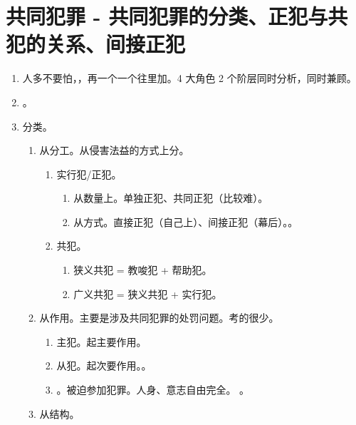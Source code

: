 \section{共同犯罪 - 共同犯罪的分类、正犯与共犯的关系、间接正犯}
\begin{enumerate}
  \item 人多不要怕，，再一个一个往里加。4 大角色 2 个阶层同时分析，同时兼顾。
  \item {}。
  \item 分类。
        \begin{enumerate}
          \item 从分工。从侵害法益的方式上分。
                \begin{enumerate}
                  \item 实行犯/正犯。
                        \begin{enumerate}
                          \item 从数量上。单独正犯、共同正犯（比较难）。
                          \item 从方式。直接正犯（自己上）、间接正犯（幕后）。。
                        \end{enumerate}
                  \item 共犯。
                        \begin{enumerate}
                          \item 狭义共犯 = 教唆犯 + 帮助犯。
                          \item 广义共犯 = 狭义共犯 + 实行犯。
                        \end{enumerate}
                \end{enumerate}
          \item 从作用。主要是涉及共同犯罪的处罚问题。考的很少。
                \begin{enumerate}
                  \item 主犯。起主要作用。
                  \item 从犯。起次要作用。。
                  \item {}。被迫参加犯罪。人身、意志自由完全。
                        。
                \end{enumerate}
          \item 从结构。

\end{enumerate}
\end{enumerate}
